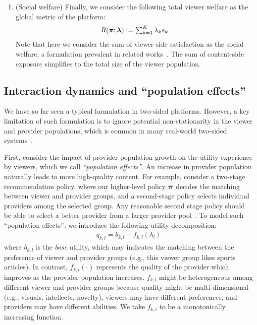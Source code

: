 \begin{enumerate}[leftmargin=12pt]
    \item (Social welfare) Finally, we consider the following total viewer welfare as the global metric of the platform:
    \begin{align*}
        R(\bm{\pi}; \bm{\lambda}) := \textstyle\sum_{k=1}^{K} \lambda_{k} s_k
    \end{align*}
    Note that here we consider the sum of viewer-side satisfaction as the social welfare, a formulation prevalent in related works~\citep{mladenov2020optimizing, huttenlocher2023matching}.
    The sum of content-side exposure simplifies to the total size of the viewer population.
\end{enumerate}

\subsection{Interaction dynamics and ``population effects''}\label{sec:dynamic_formulation}

We have so far seen a typical formulation in two-sided platforms. However, a key limitation of such formulation is to ignore potential non-stationarity in the viewer and provider populations, which is common in many real-world two-sided systems~\citep{boutilier2023modeling,  deffayet2024sardine}. 

First, consider the impact of provider population growth on the utility experience by viewers, which we call \textit{``population effects''}.
An increase in provider population naturally leads to more high-quality content. 
For example, consider a two-stage recommendation policy, where our higher-level policy $\bm{\pi}$ decides the matching between viewer and provider groups, and a second-stage policy selects individual providers among the selected group. 
Any reasonable second stage policy should be able to select a better provider from a larger provider pool~\citep{su2023value, evnine2024achieving}. 
To model such ``population effects'', we introduce the following utility decomposition:
\begin{align}
    q_{k,l} = b_{k,l} + f_{k,l}(\lambda_{l}) \label{eq:reward_decomposition}
\end{align}
where $b_{k,l}$ is the \textit{base} utility, which may indicates the matching between the preference of viewer and provider groups (e.g., this viewer group likes sports articles). In contrast, $f_{k,l}(\cdot)$ represents the quality of the provider which improves as the provider population increases. $f_{k,l}$ might be heterogeneous among different viewer and provider groups because quality might be multi-dimensional (e.g., visuals, intellects, novelty), viewers may have different preferences, and providers may have different abilities. 
We take $f_{k,l}$ to be a monotonically increasing function.

